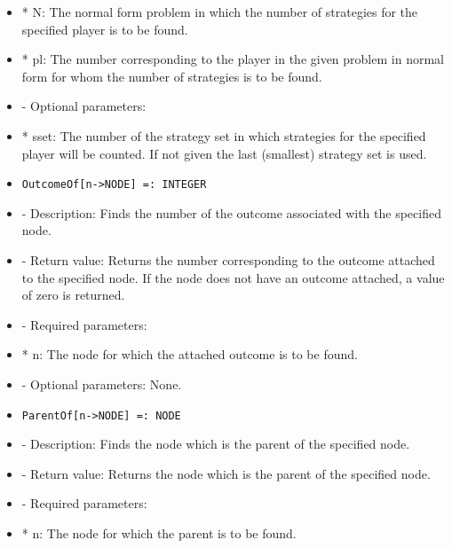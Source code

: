 \begin{itemize}
\bd
\item
*  N:  The normal form problem in which the number of strategies for
the specified player is to be found.
\item
*  pl:  The number corresponding to the player in the given problem 
in normal form for whom the number of strategies is to be
found.
\ed

\item
- Optional parameters:
	
\bd
\item  
*  sset:  The number of the strategy set in which strategies for the
specified player will be counted.  If not given the last (smallest) 
strategy set is used.

\ed
\ed

\item

\begin{verbatim}
OutcomeOf[n->NODE] =: INTEGER
\end{verbatim}

\bd

\item
- Description:  Finds the number of the outcome associated with the 
specified node.
\item
- Return value:  Returns the number corresponding to the outcome attached
to the specified node.  If the node does not have an outcome attached,
a value of zero is returned.
\item
- Required parameters:
	
\bd
\item
*  n:  The node for which the attached outcome is to be found.
\ed

\item
- Optional parameters:  None.
\ed

\item

\begin{verbatim}
ParentOf[n->NODE] =: NODE
\end{verbatim}

\bd
\item
- Description:  Finds the node which is the parent of the specified node.
\item
- Return value:  Returns the node which is the parent of the specified
node.
\item
- Required parameters:
	
\bd
\item
*  n:  The node for which the parent is to be found.
\ed


\end{itemize}
